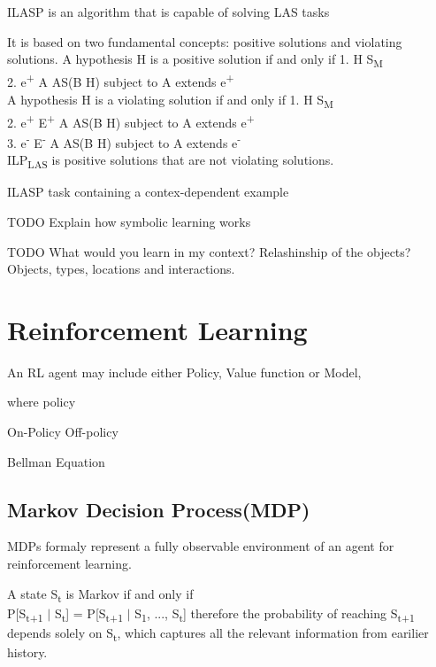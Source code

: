 \documentclass[12pt,twoside]{report}
\begin{document}
ILASP is an algorithm that is capable of solving LAS tasks

It is based on two fundamental concepts: positive solutions and violating solutions.
A hypothesis H is a positive solution if and only if
1. H \subseteq S\textsubscript{M} \\
2. \forall e\textsuperscript{+} \in \exists A \in AS(B \cup H) subject to A extends e\textsuperscript{+}\\

A hypothesis H is a violating solution if and only if
1. H \subseteq S\textsubscript{M} \\
2. \forall e\textsuperscript{+} \in E\textsuperscript{+} \exists A \in AS(B \cup H) subject to A extends e\textsuperscript{+}\\
3. \exists e\textsuperscript{-} \in E\textsuperscript{-} \exists A \in AS(B \cup H) subject to A extends e\textsuperscript{-}\\


ILP\textsubscript{LAS} is positive solutions that are not violating solutions.

ILASP task containing a contex-dependent example

TODO Explain how symbolic learning works

TODO What would you learn in my context? Relashinship of the objects?
Objects, types, locations and interactions.

\section{Reinforcement Learning}
An RL agent may include either Policy, Value function or Model,

where policy

On-Policy
Off-policy

Bellman Equation

\subsection{Markov Decision Process(MDP)}

MDPs formaly represent a fully observable environment of an agent for reinforcement learning.

A state S\textsubscript{t} is Markov if and only if \\
P[S\textsubscript{t+1} $\vert$ S\textsubscript{t}] = P[S\textsubscript{t+1} $\vert$ S\textsubscript{1}, ..., S\textsubscript{t}] therefore the probability of reaching S\textsubscript{t+1} depends solely on S\textsubscript{t}, which captures all the relevant information from earilier history.
\end{document}
